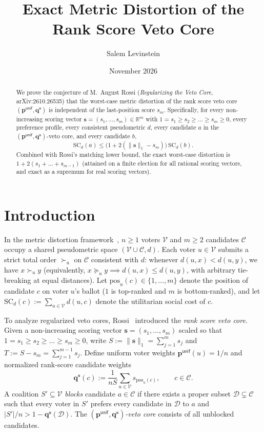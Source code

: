 \documentclass[11pt]{article}
\title{Exact Metric Distortion of the Rank Score Veto Core}
\author{Salem Levinstein}
\date{November 2026}
\newcommand{\SC}{\mathrm{SC}}
\newcommand{\pos}{\mathrm{pos}}
\newcommand{\unif}{\mathsf{unif}}
\begin{document}
\maketitle

\begin{abstract}
We prove the conjecture of M.~August Rossi (\emph{Regularizing the Veto Core}, arXiv:2610.26535) that the worst-case metric distortion of the rank score veto core $(\mathbf{p}^{\unif}, \mathbf{q}^{\mathbf{s}})$ is independent of the last-position score $s_m$. Specifically, for every non-increasing scoring vector $\mathbf{s} = (s_1, \dots, s_m) \in \mathbb{R}^m$ with $1 = s_1 \ge s_2 \ge \dots \ge s_m \ge 0$, every preference profile, every consistent pseudometric $d$, every candidate $a$ in the $(\mathbf{p}^{\unif}, \mathbf{q}^{\mathbf{s}})$-veto core, and every candidate $b$,
\[
\SC_d(a) \le \bigl(1 + 2(\|\mathbf{s}\|_1 - s_m)\bigr)\,\SC_d(b).
\]
Combined with Rossi's matching lower bound, the exact worst-case distortion is $1 + 2(s_1 + \dots + s_{m-1})$ (attained on a finite election for all rational scoring vectors, and exact as a supremum for real scoring vectors).
\end{abstract}

\section{Introduction}

In the metric distortion framework~\cite{ABEPS2018}, $n \ge 1$ voters $\mathcal{V}$ and $m \ge 2$ candidates $\mathcal{C}$ occupy a shared pseudometric space $(\mathcal{V} \cup \mathcal{C}, d)$. Each voter $u \in \mathcal{V}$ submits a strict total order $\succ_u$ on $\mathcal{C}$ consistent with $d$: whenever $d(u, x) < d(u, y)$, we have $x \succ_u y$ (equivalently, $x \succcurlyeq_u y \implies d(u, x) \le d(u, y)$, with arbitrary tie-breaking at equal distances). Let $\pos_u(c) \in \{1, \dots, m\}$ denote the position of candidate $c$ on voter $u$'s ballot ($1$ is top-ranked and $m$ is bottom-ranked), and let $\SC_d(c) := \sum_{u \in \mathcal{V}} d(u, c)$ denote the utilitarian social cost of $c$.

To analyze regularized veto cores, Rossi~\cite{Rossi2026} introduced the \emph{rank score veto core}. Given a non-increasing scoring vector $\mathbf{s} = (s_1, \dots, s_m)$ scaled so that $1 = s_1 \ge s_2 \ge \dots \ge s_m \ge 0$, write $S := \|\mathbf{s}\|_1 = \sum_{j=1}^m s_j$ and $T := S - s_m = \sum_{j=1}^{m-1} s_j$. Define uniform voter weights $\mathbf{p}^{\unif}(u) = 1/n$ and normalized rank-score candidate weights
\[
\mathbf{q}^{\mathbf{s}}(c) := \frac{1}{nS} \sum_{u \in \mathcal{V}} s_{\pos_u(c)}, \qquad c \in \mathcal{C}.
\]
A coalition $S' \subseteq \mathcal{V}$ \emph{blocks} candidate $a \in \mathcal{C}$ if there exists a proper subset $\mathcal{D} \subsetneq \mathcal{C}$ such that every voter in $S'$ prefers every candidate in $\mathcal{D}$ to $a$ and $|S'|/n > 1 - \mathbf{q}^{\mathbf{s}}(\mathcal{D})$. The \emph{$(\mathbf{p}^{\unif}, \mathbf{q}^{\mathbf{s}})$-veto core} consists of all unblocked candidates.
\end{document}
